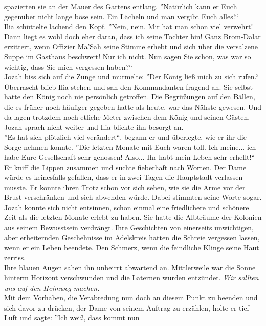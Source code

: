 spazierten sie an der Mauer des Gartens entlang. ''Natürlich kann er Euch gegenüber nicht lange 
böse sein. Ein Lächeln und man vergibt Euch alles!``\\
Ilia schüttelte lachend den Kopf. ''Nein, nein. Mir hat man schon viel verwehrt! Dann liegt es wohl 
doch eher daran, dass ich seine Tochter bin! Ganz Brom-Dalar erzittert, wenn Offizier Ma'Sah seine 
Stimme erhebt und sich über die versalzene Suppe im Gasthaus beschwert! Nur ich nicht. Nun sagen 
Sie schon, was war so wichtig, dass Sie mich vergessen haben?``\\
Jozah biss sich auf die Zunge und murmelte: ''Der König ließ mich zu sich rufen.``\\
Überrascht blieb Ilia stehen und sah den Kommandanten fragend an. Sie selbst hatte den König noch 
nie persönlich getroffen. Die Begrüßungen auf den Bällen, die es früher noch häufiger gegeben hatte 
als heute, war das Nähste gewesen. Und da lagen trotzdem noch etliche Meter zwischen dem König und 
seinen Gästen. Jozah sprach nicht weiter und Ilia blickte ihn besorgt an.\\
''Es hat sich plötzlich viel verändert``, begann er und überlegte, wie er ihr die Sorge nehmen 
konnte. ''Die letzten Monate mit Euch waren toll. Ich meine... ich habe Eure Gesellschaft sehr 
genossen! Also... Ihr habt mein Leben sehr erhellt!``\\
Er kniff die Lippen zusammen und suchte fieberhaft nach Worten. Der Dame würde es keinesfalls 
gefallen, dass er in zwei Tagen die Hauptstadt verlassen musste. Er konnte ihren Trotz schon vor 
sich sehen, wie sie die Arme vor der Brust verschränken und sich abwenden würde. Dabei stimmten 
seine Worte sogar. Jozah konnte sich nicht entsinnen, schon einmal eine friedlichere und schönere 
Zeit als die letzten Monate erlebt zu haben. Sie hatte die Albträume der Kolonien aus seinem 
Bewusstsein verdrängt. Ihre Geschichten von einerseits unwichtigen, aber erheiternden Geschehnisse 
im Adelskreis hatten die Schreie vergessen lassen, wenn er ein Leben beendete. Den Schmerz, wenn 
die feindliche Klinge seine Haut zerriss.\\
Ihre blauen Augen sahen ihn unbeirrt abwartend an. Mittlerweile war die Sonne hinterm Horizont 
verschwunden und die Laternen wurden entzündet. \textit{Wir sollten uns auf den Heimweg machen.}\\
Mit dem Vorhaben, die Verabredung nun doch an diesem Punkt zu beenden und sich davor zu drücken, 
der Dame von seinem Auftrag zu erzählen, holte er tief Luft und sagte: ''Ich weiß, dass kommt nun 
